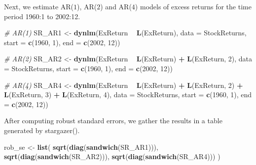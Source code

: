\documentclass[]{book}
\newenvironment{Shaded}{\begin{snugshade}}{\end{snugshade}}
\newcommand{\KeywordTok}[1]{\textcolor[rgb]{0.13,0.29,0.53}{\textbf{#1}}}
\newcommand{\DataTypeTok}[1]{\textcolor[rgb]{0.13,0.29,0.53}{#1}}
\newcommand{\DecValTok}[1]{\textcolor[rgb]{0.00,0.00,0.81}{#1}}
\newcommand{\StringTok}[1]{\textcolor[rgb]{0.31,0.60,0.02}{#1}}
\newcommand{\CommentTok}[1]{\textcolor[rgb]{0.56,0.35,0.01}{\textit{#1}}}
\newcommand{\OperatorTok}[1]{\textcolor[rgb]{0.81,0.36,0.00}{\textbf{#1}}}
\newcommand{\NormalTok}[1]{#1}
\theoremstyle{definition}
\theoremstyle{definition}
\theoremstyle{definition}
\theoremstyle{remark}
\begin{document}
Next, we estimate AR(\(1\)), AR(\(2\)) and AR(\(4\)) models of excess
returns for the time period 1960:1 to 2002:12.

\begin{Shaded}
\begin{Highlighting}[]
\CommentTok{# AR(1)}
\NormalTok{SR_AR1 <-}\StringTok{ }\KeywordTok{dynlm}\NormalTok{(ExReturn }\OperatorTok{~}\StringTok{ }\KeywordTok{L}\NormalTok{(ExReturn), }
      \DataTypeTok{data =}\NormalTok{ StockReturns, }\DataTypeTok{start =} \KeywordTok{c}\NormalTok{(}\DecValTok{1960}\NormalTok{, }\DecValTok{1}\NormalTok{), }\DataTypeTok{end =} \KeywordTok{c}\NormalTok{(}\DecValTok{2002}\NormalTok{, }\DecValTok{12}\NormalTok{))}

\CommentTok{# AR(2)}
\NormalTok{SR_AR2 <-}\StringTok{ }\KeywordTok{dynlm}\NormalTok{(ExReturn }\OperatorTok{~}\StringTok{ }\KeywordTok{L}\NormalTok{(ExReturn) }\OperatorTok{+}\StringTok{ }\KeywordTok{L}\NormalTok{(ExReturn, }\DecValTok{2}\NormalTok{), }
      \DataTypeTok{data =}\NormalTok{ StockReturns, }\DataTypeTok{start =} \KeywordTok{c}\NormalTok{(}\DecValTok{1960}\NormalTok{, }\DecValTok{1}\NormalTok{), }\DataTypeTok{end =} \KeywordTok{c}\NormalTok{(}\DecValTok{2002}\NormalTok{, }\DecValTok{12}\NormalTok{))}

\CommentTok{# AR(4)}
\NormalTok{SR_AR4 <-}\StringTok{ }\KeywordTok{dynlm}\NormalTok{(ExReturn }\OperatorTok{~}\StringTok{ }\KeywordTok{L}\NormalTok{(ExReturn) }\OperatorTok{+}\StringTok{ }\KeywordTok{L}\NormalTok{(ExReturn, }\DecValTok{2}\NormalTok{) }\OperatorTok{+}\StringTok{ }\KeywordTok{L}\NormalTok{(ExReturn, }\DecValTok{3}\NormalTok{) }\OperatorTok{+}\StringTok{ }\KeywordTok{L}\NormalTok{(ExReturn, }\DecValTok{4}\NormalTok{), }
      \DataTypeTok{data =}\NormalTok{ StockReturns, }\DataTypeTok{start =} \KeywordTok{c}\NormalTok{(}\DecValTok{1960}\NormalTok{, }\DecValTok{1}\NormalTok{), }\DataTypeTok{end =} \KeywordTok{c}\NormalTok{(}\DecValTok{2002}\NormalTok{, }\DecValTok{12}\NormalTok{))}
\end{Highlighting}
\end{Shaded}

After computing robust standard errors, we gather the results in a table
generated by stargazer().

\begin{Shaded}
\begin{Highlighting}[]
\NormalTok{rob_se <-}\StringTok{ }\KeywordTok{list}\NormalTok{(}
  \KeywordTok{sqrt}\NormalTok{(}\KeywordTok{diag}\NormalTok{(}\KeywordTok{sandwich}\NormalTok{(SR_AR1))),}
  \KeywordTok{sqrt}\NormalTok{(}\KeywordTok{diag}\NormalTok{(}\KeywordTok{sandwich}\NormalTok{(SR_AR2))),}
  \KeywordTok{sqrt}\NormalTok{(}\KeywordTok{diag}\NormalTok{(}\KeywordTok{sandwich}\NormalTok{(SR_AR4)))}
\NormalTok{  )}
\end{Highlighting}
\end{Shaded}
\end{document}
